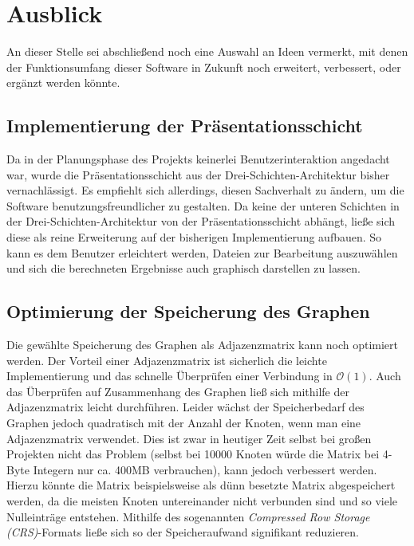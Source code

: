 \chapter{Ausblick}
\label{Ausblick}

An dieser Stelle sei abschlie{\ss}end noch eine Auswahl an Ideen
vermerkt, mit denen der
Funktionsumfang dieser Software in Zukunft noch erweitert, verbessert,
oder erg\"anzt werden k\"onnte.

\section{Implementierung der Pr\"asentationsschicht}

Da in der Planungsphase des Projekts keinerlei Benutzerinteraktion
angedacht war, wurde die Pr\"asentationsschicht aus der
Drei-Schichten-Architektur bisher vernachl\"assigt. Es empfiehlt sich
allerdings, diesen Sachverhalt zu \"andern, um die Software
benutzungsfreundlicher zu gestalten. Da keine der unteren Schichten in
der Drei-Schichten-Architektur von der Pr\"asentationsschicht
abh\"angt, lie{\ss}e sich diese als reine Erweiterung
auf der bisherigen Implementierung aufbauen. So kann es dem Benutzer
erleichtert werden, Dateien zur Bearbeitung auszuw\"ahlen und sich die
berechneten Ergebnisse auch graphisch darstellen zu lassen.

\section{Optimierung der Speicherung des Graphen}

Die gew\"ahlte Speicherung des Graphen als Adjazenzmatrix kann noch
optimiert werden. Der Vorteil einer Adjazenzmatrix ist sicherlich die
leichte Implementierung und das schnelle \"Uberpr\"ufen einer
Verbindung in \(\mathcal{O}(1)\). Auch das \"Uberpr\"ufen auf
Zusammenhang des Graphen lie{\ss} sich mithilfe der Adjazenzmatrix
leicht durchf\"uhren. Leider w\"achst der Speicherbedarf des Graphen
jedoch quadratisch mit der Anzahl der Knoten, wenn man eine
Adjazenzmatrix verwendet. Dies ist zwar in heutiger Zeit selbst bei
gro{\ss}en Projekten nicht das Problem (selbst bei 10000 Knoten
w\"urde die Matrix bei 4-Byte Integern nur ca. 400MB verbrauchen),
kann jedoch verbessert werden. Hierzu k\"onnte die Matrix
beispielsweise als d\"unn besetzte Matrix abgespeichert
werden, da die meisten Knoten untereinander nicht verbunden sind und
so viele Nulleintr\"age entstehen. Mithilfe des sogenannten \textit{Compressed Row
  Storage (CRS)}-Formats lie{\ss}e sich so der Speicheraufwand signifikant
reduzieren.

